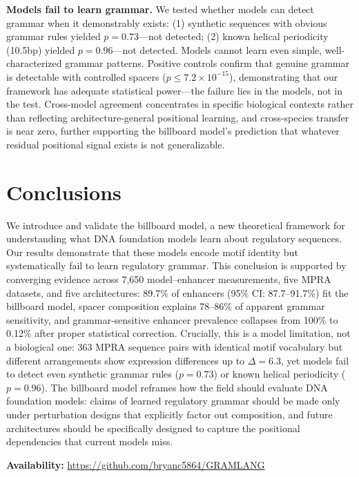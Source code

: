 \documentclass[10pt]{article}
\begin{document}
\textbf{Models fail to learn grammar.} We tested whether models can detect grammar when it demonstrably exists: (1) synthetic sequences with obvious grammar rules yielded $p = 0.73$---not detected; (2) known helical periodicity (10.5bp) yielded $p = 0.96$---not detected.
Models cannot learn even simple, well-characterized grammar patterns.
Positive controls confirm that genuine grammar is detectable with controlled spacers ($p \le 7.2\times10^{-15}$), demonstrating that our framework has adequate statistical power---the failure lies in the models, not in the test.
Cross-model agreement concentrates in specific biological contexts rather than reflecting architecture-general positional learning, and cross-species transfer is near zero, further supporting the billboard model's prediction that whatever residual positional signal exists is not generalizable.

\section*{Conclusions}

We introduce and validate the billboard model, a new theoretical framework for understanding what DNA foundation models learn about regulatory sequences.
Our results demonstrate that these models encode motif identity but systematically fail to learn regulatory grammar.
This conclusion is supported by converging evidence across 7,650 model--enhancer measurements, five MPRA datasets, and five architectures: 89.7\% of enhancers (95\% CI: 87.7--91.7\%) fit the billboard model, spacer composition explains 78--86\% of apparent grammar sensitivity, and grammar-sensitive enhancer prevalence collapses from 100\% to 0.12\% after proper statistical correction.
Crucially, this is a model limitation, not a biological one: 363 MPRA sequence pairs with identical motif vocabulary but different arrangements show expression differences up to $\Delta = 6.3$, yet models fail to detect even synthetic grammar rules ($p = 0.73$) or known helical periodicity ($p = 0.96$).
The billboard model reframes how the field should evaluate DNA foundation models: claims of learned regulatory grammar should be made only under perturbation designs that explicitly factor out composition, and future architectures should be specifically designed to capture the positional dependencies that current models miss.

\vspace{3pt}
\noindent\textbf{Availability:} \url{https://github.com/bryanc5864/GRAMLANG}
\end{document}
